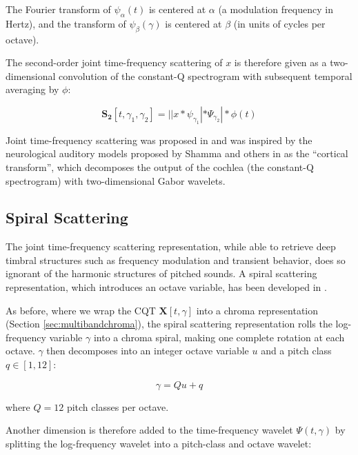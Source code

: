 The Fourier transform of $\psi_{\alpha}(t)$ is centered at $\alpha$ (a modulation frequency in Hertz), and the transform of $\psi_{\beta}(\gamma)$ is centered at $\beta$ (in units of cycles per octave).

The second-order joint time-frequency scattering of $x$ is therefore given as a two-dimensional convolution of the constant-Q spectrogram with subsequent temporal averaging by $\phi$:

\begin{equation}
\mathbf{S_2} [t, \gamma_1, \gamma_2] = || x \ast \psi_{\gamma_1} | \ast \Psi_{\gamma_2} | \ast \phi(t)
\end{equation}

Joint time-frequency scattering was proposed in \cite{anden2015joint} and was inspired by the neurological auditory models proposed by Shamma and others in \cite{chi2005multiresolution} as the ``cortical transform'', which decomposes the output of the cochlea (\ie the constant-Q spectrogram) with two-dimensional Gabor wavelets.

\subsection{Spiral Scattering}
\label{sec:spiralscattering}

The joint time-frequency scattering representation, while able to retrieve deep timbral structures such as frequency modulation and transient behavior, does so ignorant of the harmonic structures of pitched sounds. A spiral scattering representation, which introduces an octave variable, has been developed in 
\cite{lostanlen2015wavelet}.

As before, where we wrap the CQT $\mathbf{X}[t,\gamma]$ into a chroma representation (Section \ref{sec:multibandchroma}), the spiral scattering representation rolls the log-frequency variable $\gamma$ into a chroma spiral, making one complete rotation at each octave. $\gamma$ then decomposes into an integer octave variable $u$ and a pitch class $q \in [1,12]$:

\begin{equation}
\gamma = Qu + q
\end{equation}

where $Q = 12$ pitch classes per octave. 

Another dimension is therefore added to the time-frequency wavelet $\Psi(t,\gamma)$ by splitting the log-frequency wavelet into a pitch-class and octave wavelet:

